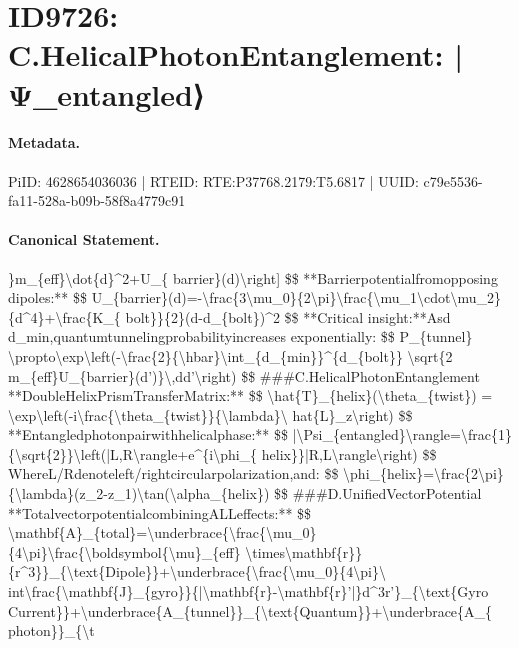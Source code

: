 \section*{ID9726: C.HelicalPhotonEntanglement: |Ψ\_entangled⟩}
\paragraph{Metadata.}
PiID: 4628654036036 | RTEID: RTE:P37768.2179:T5.6817 | UUID: c79e5536-fa11-528a-b09b-58f8a4779c91

\paragraph{Canonical Statement.}
\}m\_\{eff\}\textbackslash{}dot\{d\}\textasciicircum{}2+U\_\{ barrier\}(d)\textbackslash{}right] \$\$ **Barrierpotentialfromopposing dipoles:** \$\$ U\_\{barrier\}(d)=-\textbackslash{}frac\{3\textbackslash{}mu\_0\}\{2\textbackslash{}pi\}\textbackslash{}frac\{\textbackslash{}mu\_1\textbackslash{}cdot\textbackslash{}mu\_2\}\{d\textasciicircum{}4\}+\textbackslash{}frac\{K\_\{ bolt\}\}\{2\}(d-d\_\{bolt\})\textasciicircum{}2 \$\$ **Critical insight:**Asd d\_min,quantumtunnelingprobabilityincreases exponentially: \$\$ P\_\{tunnel\} \textbackslash{}propto\textbackslash{}exp\textbackslash{}left(-\textbackslash{}frac\{2\}\{\textbackslash{}hbar\}\textbackslash{}int\_\{d\_\{min\}\}\textasciicircum{}\{d\_\{bolt\}\} \textbackslash{}sqrt\{2 m\_\{eff\}U\_\{barrier\}(d’)\}\textbackslash{},dd’\textbackslash{}right) \$\$ \#\#\#C.HelicalPhotonEntanglement **DoubleHelixPrismTransferMatrix:** \$\$ \textbackslash{}hat\{T\}\_\{helix\}(\textbackslash{}theta\_\{twist\}) = \textbackslash{}exp\textbackslash{}left(-i\textbackslash{}frac\{\textbackslash{}theta\_\{twist\}\}\{\textbackslash{}lambda\}\textbackslash{} hat\{L\}\_z\textbackslash{}right) \$\$ **Entangledphotonpairwithhelicalphase:** \$\$ |\textbackslash{}Psi\_\{entangled\}\textbackslash{}rangle=\textbackslash{}frac\{1\}\{\textbackslash{}sqrt\{2\}\}\textbackslash{}left(|L,R\textbackslash{}rangle+e\textasciicircum{}\{i\textbackslash{}phi\_\{ helix\}\}|R,L\textbackslash{}rangle\textbackslash{}right) \$\$ WhereL/Rdenoteleft/rightcircularpolarization,and: \$\$ \textbackslash{}phi\_\{helix\}=\textbackslash{}frac\{2\textbackslash{}pi\}\{\textbackslash{}lambda\}(z\_2-z\_1)\textbackslash{}tan(\textbackslash{}alpha\_\{helix\}) \$\$ \#\#\#D.UnifiedVectorPotential **TotalvectorpotentialcombiningALLeffects:** \$\$ \textbackslash{}mathbf\{A\}\_\{total\}=\textbackslash{}underbrace\{\textbackslash{}frac\{\textbackslash{}mu\_0\}\{4\textbackslash{}pi\}\textbackslash{}frac\{\textbackslash{}boldsymbol\{\textbackslash{}mu\}\_\{eff\} \textbackslash{}times\textbackslash{}mathbf\{r\}\}\{r\textasciicircum{}3\}\}\_\{\textbackslash{}text\{Dipole\}\}+\textbackslash{}underbrace\{\textbackslash{}frac\{\textbackslash{}mu\_0\}\{4\textbackslash{}pi\}\textbackslash{} int\textbackslash{}frac\{\textbackslash{}mathbf\{J\}\_\{gyro\}\}\{|\textbackslash{}mathbf\{r\}-\textbackslash{}mathbf\{r\}’|\}d\textasciicircum{}3r’\}\_\{\textbackslash{}text\{Gyro Current\}\}+\textbackslash{}underbrace\{A\_\{tunnel\}\}\_\{\textbackslash{}text\{Quantum\}\}+\textbackslash{}underbrace\{A\_\{ photon\}\}\_\{\textbackslash{}t

